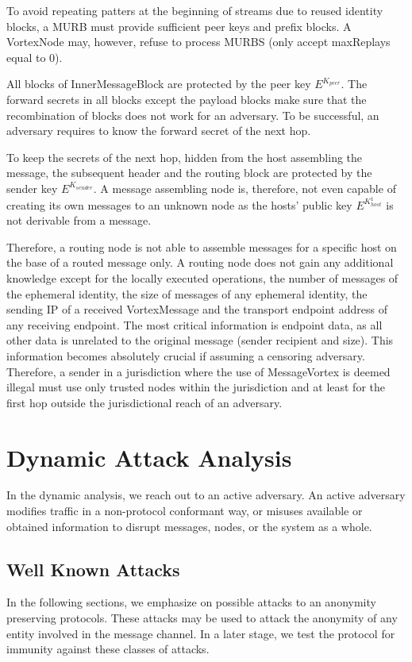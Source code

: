 To avoid repeating patters at the beginning of streams due to reused identity blocks, a MURB must provide sufficient peer keys and prefix blocks. A VortexNode may, however, refuse to process MURBS (only accept maxReplays equal to 0).

All blocks of InnerMessageBlock are protected by the peer key $E^{K_{peer}}$. The forward secrets in all blocks except the payload blocks make sure that the recombination of blocks does not work for an adversary. To be successful, an adversary requires to know the forward secret of the next hop.

To keep the secrets of the next hop, hidden from the host assembling the message, the subsequent header and the routing block are protected by the sender key $E^{K_{sender}}$. A message assembling node is, therefore, not even capable of creating its own messages to an unknown node as the hosts' public key $E^{K^{1}_{host}}$ is not derivable from a message.

Therefore, a routing node is not able to assemble messages for a specific host on the base of a routed message only. A routing node does not gain any additional knowledge except for the locally executed operations, the number of messages of the ephemeral identity, the size of messages of any ephemeral identity, the sending IP of a received VortexMessage and the transport endpoint address of any receiving endpoint. The most critical information is endpoint data, as all other data is unrelated to the original message (sender recipient and size). This information becomes absolutely crucial if assuming a censoring adversary. Therefore, a sender in a jurisdiction where the use of MessageVortex is deemed illegal must use only trusted nodes within the jurisdiction and at least for the first hop outside the jurisdictional reach of an adversary.


\chapter{Dynamic Attack Analysis}
In the dynamic analysis, we reach out to an active adversary. An active adversary modifies traffic in a non-protocol conformant way, or misuses available or obtained information to disrupt messages, nodes, or the system as a whole.

\section{Well Known Attacks}\label{sec:wellKnownAttacks}
In the following sections, we emphasize on possible attacks to an anonymity preserving protocols. These attacks may be used to attack the anonymity of any entity involved in the message channel. In a later stage, we test the protocol for immunity against these classes of attacks.

